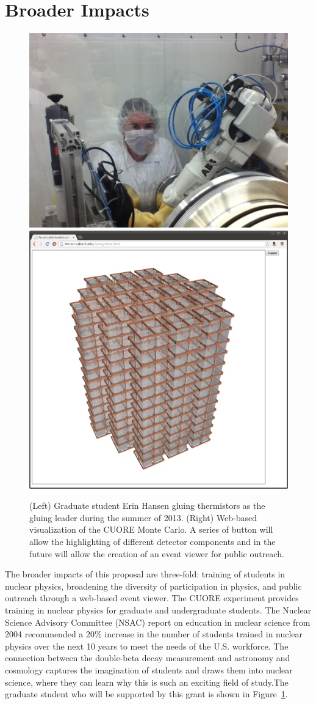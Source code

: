 \section{Broader Impacts}

\begin{figure}
\begin{center}
\includegraphics[width=0.35\columnwidth]{figs/Erin1.jpg} 
\includegraphics[width=0.3\columnwidth]{figs/viewerPlain.png} 
\end{center}
\caption{\label{broad} (Left) Graduate student Erin Hansen gluing thermistors as the gluing leader during the summer of 2013. (Right) Web-based visualization of the CUORE Monte Carlo. A series of button will allow the highlighting of different detector components and in the future will allow the creation of an event viewer for public outreach. }
\end{figure}

The broader impacts of this proposal are three-fold: training of students in nuclear physics, broadening the diversity of participation in physics, and public outreach through a web-based event viewer. The CUORE experiment provides training in nuclear physics for graduate and undergraduate students. The Nuclear Science Advisory Committee (NSAC) report on education in nuclear science from 2004 recommended a 20\% increase in the number of students trained in nuclear physics over the next 10 years to meet the needs of the U.S. workforce\cite{nuced}. The connection between the double-beta decay measurement and astronomy and cosmology captures the imagination of students and draws them into nuclear science, where they can learn why this is such an exciting field of study.The graduate student who will be supported by this grant is shown in Figure~\ref{broad}.

